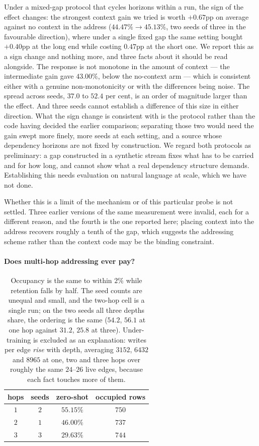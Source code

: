 \documentclass[11pt,a4paper]{article}
\begin{document}
Under a mixed-gap protocol that cycles horizons within a run, the sign of the
effect changes: the strongest context gain we tried is worth $+0.67$pp on
average against no context in the address ($44.47\%\to45.13\%$, two seeds of
three in the favourable direction), where under a single fixed gap the same
setting bought $+0.40$pp at the long end while costing $0.47$pp at the short
one. We report this as a sign change and nothing more, and three facts about it
should be read alongside. The response is not monotone in the amount of
context --- the intermediate gain gave $43.00\%$, below the no-context arm ---
which is consistent either with a genuine non-monotonicity or with the
differences being noise. The spread across seeds, $37.0$ to $52.4$ per cent, is
an order of magnitude larger than the effect. And three seeds cannot establish
a difference of this size in either direction. What the sign change is
consistent with is the protocol rather than the code having decided the earlier
comparison; separating those two would need the gain swept more finely, more
seeds at each setting, and a source whose dependency horizons are not fixed by
construction. We regard both protocols as
preliminary: a gap constructed in a synthetic stream fixes what has to be
carried and for how long, and cannot show what a real dependency structure
demands. Establishing this needs evaluation on natural language at scale, which
we have not done.

Whether this is a limit of the mechanism or of this particular probe is not
settled. Three earlier versions of the same measurement were invalid, each for
a different reason, and the fourth is the one reported here; placing context
into the address recovers roughly a tenth of the gap, which suggests the
addressing scheme rather than the context code may be the binding constraint.

\paragraph{Does multi-hop addressing ever pay?}

\begin{table}[h]
\centering
\begin{tabular}{cccc}
\toprule
hops & seeds & zero-shot & occupied rows \\
\midrule
$1$ & $2$ & $\mathbf{55.15\%}$ & $750$ \\
$2$ & $1$ & $46.00\%$ & $737$ \\
$3$ & $3$ & $29.63\%$ & $744$ \\
\bottomrule
\end{tabular}
\caption{Occupancy is the same to within $2\%$ while retention falls by half.
The seed counts are unequal and small, and the two-hop cell is a single run; on
the two seeds all three depths share, the ordering is the same ($54.2$, $56.1$
at one hop against $31.2$, $25.8$ at three). Under-training is excluded as an
explanation: writes per edge \emph{rise} with depth, averaging $3152$, $6432$
and $8965$ at one, two and three hops over roughly the same $24$--$26$ live
edges, because each fact touches more of them.}
\end{table}
\end{document}
